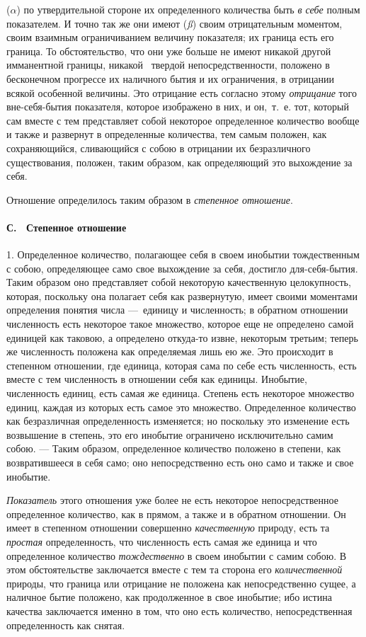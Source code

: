 ({\em $\alpha $}) по утвердительной стороне их
определенного количества быть {\em в себе} полным
показателем. И точно так же они имеют ({\em ß}) своим
отрицательным моментом, своим взаимным ограничиванием величину показателя;
их граница есть его граница. То обстоятельство, что они уже больше не имеют
никакой другой имманентной границы,
никакой~\label{bkm:Ref474666541}
твердой непосредственности, положено в бесконечном прогрессе их наличного
бытия и их ограничения, в отрицании всякой особенной величины. Это
отрицание есть согласно этому {\em отрицание} того
вне-себя-бытия показателя, которое изображено в них, и он,~т.~е. тот,
который сам вместе с тем представляет собой некоторое определенное
количество вообще и также и развернут в определенные количества, тем самым
положен, как сохраняющийся, сливающийся с собою в отрицании их
безразличного существования, положен, таким образом, как определяющий это
выхождение за себя.

Отношение определилось таким образом в {\em степенное
отношение}.

\paragraph[С. \ Степенное отношение]{С. \ Степенное отношение}
1. Определенное количество, полагающее себя в
своем инобытии тождественным с собою, определяющее само свое выхождение за
себя, достигло для-себя-бытия. Таким образом оно представляет собой
некоторую качественную целокупность, которая, поскольку она полагает себя
как развернутую, имеет своими моментами определения понятия числа —~единицу
и численность; в обратном отношении численность есть некоторое такое
множество, которое еще не определено самой единицей как таковою, а
определено откуда-то извне, некоторым третьим; теперь же численность
положена как определяемая лишь ею же. Это происходит в степенном отношении,
где единица, которая сама по себе есть численность, есть вместе с тем
численность в отношении себя как единицы. Инобытие, численность единиц,
есть самая же единица. Степень есть некоторое множество единиц, каждая из
которых есть самое это множество. Определенное количество как безразличная
определенность изменяется; но поскольку это изменение есть возвышение в
степень, это его инобытие ограничено исключительно самим собою. — Таким
образом, определенное количество положено в степени, как возвратившееся в
себя само; оно непосредственно есть оно само и также и свое инобытие.

{\em Показатель} этого отношения уже более не есть
некоторое непосредственное определенное количество, как в прямом, а также и
в обратном отношении. Он имеет в степенном отношении совершенно
{\em качественную} природу, есть та
{\em простая} определенность, что численность есть
самая же единица и что определенное количество
{\em тождественно} в своем инобытии с самим собою. В
этом обстоятельстве заключается вместе с тем та сторона его
{\em количественной} природы, что граница или отрицание
не положена как непосредственно сущее, а наличное бытие положено, как
продолженное в свое инобытие; ибо истина качества заключается именно в том,
что оно есть количество, непосредственная определенность как снятая.

